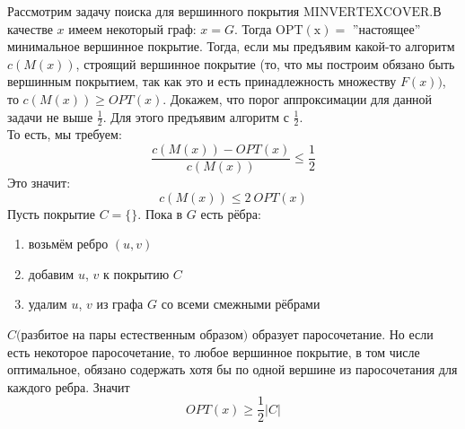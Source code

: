 \documentclass[11pt]{article}
\begin{document}
\begin{example}
    Рассмотрим задачу поиска для вершинного покрытия $\mathrm{MINVERTEXCOVER}$.В качестве $x$ имеем некоторый граф: $x=G$. 
    Тогда $\mathrm{OPT(x)} = $ ''настоящее'' минимальное вершинное покрытие.
    Тогда, если мы предъявим какой-то алгоритм $c(M(x))$, строящий вершинное покрытие (то, что мы построим обязано быть вершинным покрытием, так как это и есть принадлежность множеству $F(x))$, то
    $c(M(x)) \geq OPT(x)$. Докажем, что порог аппроксимации для данной задачи не выше $\frac{1}{2}$. Для этого предъявим алгоритм с $\frac{1}{2}$. \\
    То есть, мы требуем:
    \[ \frac{c(M(x))- OPT(x)}{c(M(x))} \leq \frac{1}{2} \]   
    Это значит: 
    \[ c(M(x)) \leq 2\ OPT(x) \]   
    Пусть покрытие $C=\{ \} .$ Пока в $G$ есть рёбра:
    \begin{enumerate}
        \item возьмём ребро $(u,v)$
        \item добавим $u$, $v$ к покрытию $C$
        \item удалим $u$, $v$ из графа $G$ со всеми смежными рёбрами
    \end{enumerate}
    $C($разбитое на пары естественным образом$)$ образует паросочетание. 
    Но если есть некоторое паросочетание, то любое вершинное покрытие, в том числе оптимальное, обязано содержать хотя бы по одной вершине из паросочетания для каждого ребра. Значит
    \[ OPT(x) \ge \frac{1}{2} |C| \] 

\end{example}
\end{document}
